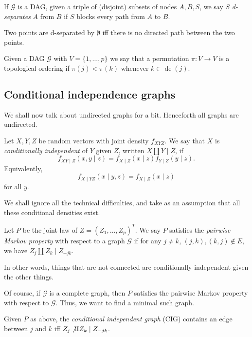 \documentclass[a4paper]{article}
\DeclareMathOperator\de{de}
\begin{document}
\begin{defi}[d-separate]
  If $\mathcal{G}$ is a DAG, given a triple of (disjoint) subsets of nodes $A, B, S$, we say $S$ \emph{d-separates} $A$ from $B$ if $S$ blocks every path from $A$ to $B$.
\end{defi}

\begin{eg}
  Two points are d-separated by $\emptyset$ iff there is no directed path between the two points.
\end{eg}

\begin{defi}
  Given a DAG $\mathcal{G}$ with $V = \{1, \ldots, p\}$ we say that a permutation $\pi: V \to V$ is a topological ordering if $\pi(j) < \pi(k)$ whenever $k \in \de(j)$.
\end{defi}

\subsection{Conditional independence graphs}
We shall now talk about undirected graphs for a bit. Henceforth all graphs are undirected.

\begin{defi}
  Let $X, Y, Z$ be random vectors with joint density $f_{XYZ}$. We say that $X$ is \emph{conditionally independent} of $Y$ given $Z$, written $X \amalg Y \mid Z$, if
  \[
    f_{XY\mid Z}(x, y \mid z) = f_{X\mid Z}(x \mid z) f_{Y \mid Z} (y \mid z).
  \]
  Equivalently,
  \[
    f_{X\mid YZ} (x \mid y, z) = f_{X \mid Z}(x \mid z)
  \]
  for all $y$.
\end{defi}
We shall ignore all the technical difficulties, and take as an assumption that all these conditional densities exist.


\begin{defi}
  Let $P$ be the joint law of $Z = (Z_1, \ldots, Z_p)^T$. We say $P$ satisfies the \emph{pairwise Markov property} with respect to a graph $\mathcal{G}$ if for any $j \not= k$, $(j, k), (k, j) \not \in E$, we have $Z_j \amalg Z_k \mid Z_{-jk}$.
\end{defi}
In other words, things that are not connected are conditionally independent given the other things.

Of course, if $\mathcal{G}$ is a complete graph, then $P$ satisfies the pairwise Markov property with respect to $\mathcal{G}$. Thus, we want to find a minimal such graph.
\begin{defi}
  Given $P$ as above, the \emph{conditional independent graph} (CIG) contains an edge between $j$ and $k$ iff $Z_j \not \amalg Z_k \mid Z_{-jk}$.
\end{defi}
\end{document}
